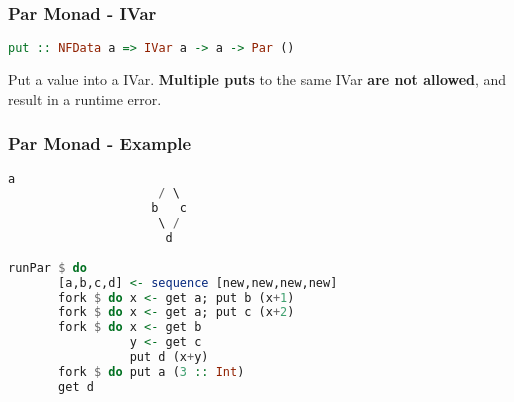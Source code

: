 \documentclass[12pt, danish]{beamer}
\begin{document}
\begin{frame}[fragile]
  \frametitle{Par Monad - IVar}
  \begin{lstlisting}[language=Haskell]
put :: NFData a => IVar a -> a -> Par ()
  \end{lstlisting} 
    
  Put a value into a IVar. \textbf{Multiple puts} to the same IVar \textbf{are not 
    allowed}, and result in a runtime error.
\end{frame}

\begin{frame}[fragile]
  \frametitle{Par Monad - Example}
  \begin{lstlisting}[language=Haskell]
                      a
                     / \  
                    b   c
                     \ /
                      d
  
runPar $ do
       [a,b,c,d] <- sequence [new,new,new,new]
       fork $ do x <- get a; put b (x+1)
       fork $ do x <- get a; put c (x+2)
       fork $ do x <- get b
                 y <- get c 
                 put d (x+y)
       fork $ do put a (3 :: Int)
       get d
  \end{lstlisting}
\end{frame}
\end{document}
